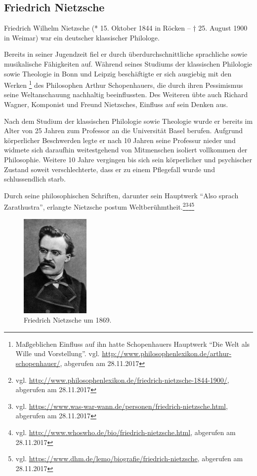 \subsection{Friedrich Nietzsche}
Friedrich Wilhelm Nietzsche (* 15. Oktober 1844 in Röcken – † 25. August 1900 in Weimar) war ein deutscher klassischer Philologe.

Bereits in seiner Jugendzeit fiel er durch überdurchschnittliche sprachliche sowie musikalische Fähigkeiten auf.
Während seines Studiums der klassischen Philologie sowie Theologie in Bonn und Leipzig beschäftigte er sich ausgiebig mit den Werken
\footnote{Maßgeblichen Einfluss auf ihn hatte Schopenhauers Hauptwerk \enquote{Die Welt als Wille und Vorstellung}. vgl. \url{http://www.philosophenlexikon.de/arthur-schopenhauer/}, abgerufen am 28.11.2017}
des Philosophen Arthur Schopenhauers, die durch ihren Pessimismus seine Weltanschauung nachhaltig beeinflussten.
Des Weiteren übte auch Richard Wagner, Komponist und Freund Nietzsches, Einfluss auf sein Denken aus.

Nach dem Studium der klassischen Philologie sowie Theologie wurde er bereits im Alter von 25 Jahren zum Professor an die Universität Basel berufen.
Aufgrund körperlicher Beschwerden legte er nach 10 Jahren seine Professur nieder und widmete sich daraufhin weitestgehend von Mitmenschen isoliert vollkommen der Philosophie.
Weitere 10 Jahre vergingen bis sich sein körperlicher und psychischer Zustand soweit verschlechterte, dass er zu einem Pflegefall wurde und schlussendlich starb.

Durch seine philosophischen Schriften, darunter sein Hauptwerk \enquote{Also sprach Zarathustra}, erlangte Nietzsche postum Weltberühmtheit.\footnote{vgl. \url{http://www.philosophenlexikon.de/friedrich-nietzsche-1844-1900/}, abgerufen am 28.11.2017}\footnote{vgl. \url{https://www.was-war-wann.de/personen/friedrich-nietzsche.html}, abgerufen am 28.11.2017}\footnote{vgl. \url{http://www.whoswho.de/bio/friedrich-nietzsche.html}, abgerufen am 28.11.2017}\footnote{vgl. \url{https://www.dhm.de/lemo/biografie/friedrich-nietzsche}, abgerufen am 28.11.2017}

\begin{figure}[H]
\centering 
 \includegraphics[width=0.3\textwidth]{Bilder/kap3/nietzschePortrait} 
 \caption{Friedrich Nietzsche um 1869.\cite{WQ14}  \label{portraitNietzsche}}
\end{figure}

